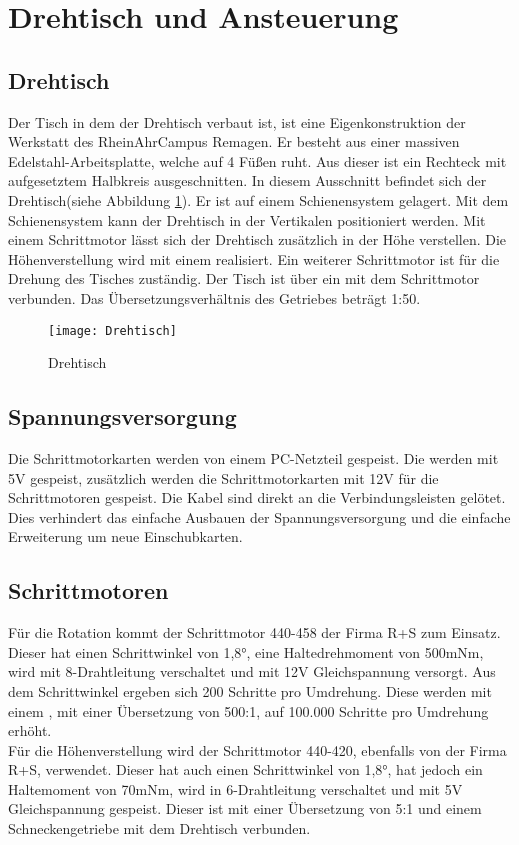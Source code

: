 \section{Drehtisch und Ansteuerung}
\label{sec:AnsteuerungDrehtisch}
\subsection{Drehtisch}
\label{sec:Drehtisch}
Der Tisch in dem der Drehtisch verbaut ist, ist eine Eigenkonstruktion der Werkstatt des RheinAhrCampus Remagen. Er besteht aus einer massiven Edelstahl-Arbeitsplatte, welche auf 4 Füßen ruht. Aus dieser ist ein Rechteck mit aufgesetztem Halbkreis ausgeschnitten. In diesem Ausschnitt befindet sich der Drehtisch(siehe Abbildung \ref{fig:Drehtisch}). Er ist auf einem Schienensystem gelagert. Mit dem Schienensystem kann der Drehtisch in der Vertikalen positioniert werden. Mit einem Schrittmotor lässt sich der Drehtisch zusätzlich in der Höhe verstellen. Die Höhenverstellung wird mit einem  realisiert. Ein weiterer Schrittmotor ist für die Drehung des Tisches zuständig. Der Tisch ist über ein  mit dem Schrittmotor verbunden. Das Übersetzungsverhältnis des Getriebes beträgt 1:50.  
\begin{figure}[h]
\centering
\texttt{[image: Drehtisch]}
\caption{Drehtisch}
\label{fig:Drehtisch}
\end{figure}
 
\subsection{Spannungsversorgung}
\label{sec:Spannungsv}
Die Schrittmotorkarten werden von einem PC-Netzteil gespeist. Die  werden mit 5V gespeist, zusätzlich werden die Schrittmotorkarten mit 12V für die Schrittmotoren gespeist. Die Kabel sind direkt an die Verbindungsleisten gelötet.\\
Dies verhindert das einfache Ausbauen der Spannungsversorgung und die einfache Erweiterung um neue Einschubkarten.
\subsection{Schrittmotoren}
\label{sec:Schrittmotoren}
Für die Rotation kommt der Schrittmotor 440-458 der Firma R+S zum Einsatz. Dieser hat einen Schrittwinkel von 1,8°, eine Haltedrehmoment von 500mNm, wird mit 8-Drahtleitung verschaltet und mit 12V Gleichspannung versorgt. Aus dem Schrittwinkel ergeben sich 200 Schritte pro Umdrehung. Diese werden mit einem , mit einer Übersetzung von 500:1, auf 100.000 Schritte pro Umdrehung erhöht.\\
Für die Höhenverstellung wird der Schrittmotor 440-420, ebenfalls von der Firma R+S, verwendet. Dieser hat auch einen Schrittwinkel von 1,8°, hat jedoch ein Haltemoment von 70mNm, wird in 6-Drahtleitung verschaltet und mit 5V Gleichspannung gespeist. Dieser ist mit einer Übersetzung von 5:1 und einem Schneckengetriebe mit dem Drehtisch verbunden.

